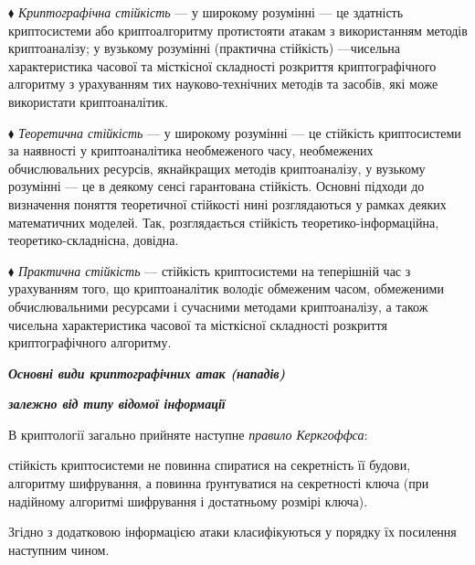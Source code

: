 ${\blacklozenge}$ \textit{Криптографічна стійкість }--- у широкому розумінні --- це
здатність криптосистеми або криптоалгоритму протистояти атакам з використанням
методів криптоаналізу; у вузькому розумінні (практична стійкість) ---чисельна
характеристика часової та місткісної складності розкриття криптографічного
алгоритму з урахуванням тих науково-технічних методів та засобів, які може
використати криптоаналітик.

${\blacklozenge}$ \textit{Теоретична стійкість }---  у широкому розумінні --- це
стійкість криптосистеми за наявності у криптоаналітика необмеженого часу,
необмежених обчислювальних ресурсів, якнайкращих методів криптоаналізу, у
вузькому розумінні --- це в деякому сенсі гарантована стійкість. Основні підходи
до визначення поняття теоретичної стійкості нині розглядаються у рамках деяких
математичних моделей. Так, розглядається стійкість теоретико-інформаційна,
теоретико-складнісна, довідна. 

${\blacklozenge}$ \textit{Практична стійкість }--- стійкість криптосистеми на
теперішній час з урахуванням того, що криптоаналітик володіє обмеженим часом,
обмеженими обчислювальними ресурсами і сучасними методами криптоаналізу,  а
також чисельна характеристика часової та місткісної складності розкриття
криптографічного алгоритму. 


\bigskip


\bigskip

{\centering\bfseries\itshape
Основні види криптографічних атак (нападів)
\par}

{\centering\bfseries\itshape
 залежно від типу відомої інформації
\par}


\bigskip


\bigskip

В криптології загально прийняте  наступне \textit{правило Керкгоффса}: 

 стійкість криптосистеми не повинна спиратися на секретність її будови,
алгоритму шифрування,  а повинна ґрунтуватися на секретності ключа (при
надійному алгоритмі шифрування і достатньому розмірі ключа). 

Згідно з додатковою інформацією атаки класифікуються у порядку їх посилення
наступним чином.

